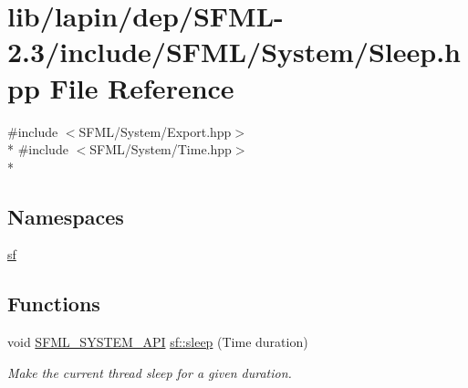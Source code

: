 \hypertarget{lapin_2dep_2_s_f_m_l-2_83_2include_2_s_f_m_l_2_system_2_sleep_8hpp}{\section{lib/lapin/dep/\-S\-F\-M\-L-\/2.3/include/\-S\-F\-M\-L/\-System/\-Sleep.hpp File Reference}
\label{lapin_2dep_2_s_f_m_l-2_83_2include_2_s_f_m_l_2_system_2_sleep_8hpp}
}
{\ttfamily \#include $<$S\-F\-M\-L/\-System/\-Export.\-hpp$>$}\\*
{\ttfamily \#include $<$S\-F\-M\-L/\-System/\-Time.\-hpp$>$}\\*
\subsection*{Namespaces}
\begin{DoxyCompactItemize}
\item 
\hyperlink{namespacesf}{sf}
\end{DoxyCompactItemize}
\subsection*{Functions}
\begin{DoxyCompactItemize}
\item 
void \hyperlink{sfml_2dep_2_s_f_m_l-2_84_82_2include_2_s_f_m_l_2_system_2_export_8hpp_a6476c9e422606477a4c23d92b1d79a1f}{S\-F\-M\-L\-\_\-\-S\-Y\-S\-T\-E\-M\-\_\-\-A\-P\-I} \hyperlink{group__system_ga2f2620831533dee0ed432ed982342e09}{sf\-::sleep} (Time duration)
\begin{DoxyCompactList}\small\item\em Make the current thread sleep for a given duration. \end{DoxyCompactList}\end{DoxyCompactItemize}
